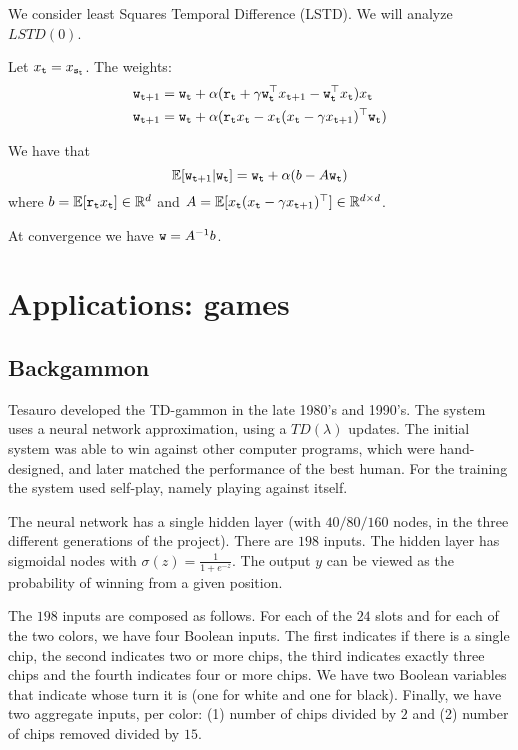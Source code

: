 \begin{leftbar}
We consider least Squares Temporal Difference (LSTD). We will
analyze $LSTD(0)$.

Let $x_{\tt t}=x_{{\tt s}_{\tt t}}$. The weights:
\begin{align*}
{\tt w}_{{\tt t}+1} &= {\tt w}_{\tt t} +\alpha ({\tt r}_{\tt t}+\gamma
{\tt w}_{\tt t}^\top x_{{\tt t}+1}-{\tt w}_{\tt t}^\top
x_{\tt t})x_{\tt t}\\
{\tt w}_{{\tt t}+1} &= {\tt w}_{\tt t} +\alpha ({\tt r}_{\tt t}
x_{\tt t}-x_{\tt t}(x_{\tt t}-\gamma x_{{\tt t}+1})^\top {\tt w}_{\tt t})
\end{align*}

We have that
\[
\mathbb{E}[{\tt w}_{{\tt t}+1}|{\tt w}_{\tt t}]={\tt w}_{\tt t} +\alpha
(b-A{\tt w}_{\tt t})
\]
where $b=\mathbb{E}[{\tt r}_{\tt t} x_{\tt t}]\in \mathbb{R}^d$ and
$A=\mathbb{E}[x_{\tt t}(x_{\tt t}-\gamma x_{{\tt t}+1})^\top]\in\mathbb{R}^{d\times
d}$.

At convergence we have ${\tt w}=A^{-1}b$.

\end{leftbar}


\section{Applications: games}

\subsection{Backgammon}

Tesauro developed the TD-gammon in the late 1980's and 1990's. The
system uses a neural network approximation, using a $TD(\lambda)$
updates. The initial system was able to win against other computer
programs, which were hand-designed, and later matched the
performance of the best human. For the training the system used
self-play, namely playing against itself.

The neural network has a single hidden layer (with $40/80/160$
nodes, in the three different generations of the project). There are
$198$ inputs. The hidden layer has sigmoidal nodes with
$\sigma(z)=\frac{1}{1+e^{-z}}$. The output $y$ can be viewed as the
probability of winning from a given position.

The $198$ inputs are composed as follows. For each of the $24$ slots
and for each of the two colors, we have four Boolean inputs. The
first indicates if there is a single chip, the second indicates two
or more chips, the third indicates exactly three chips and the
fourth indicates four or more chips. We have two Boolean variables
that indicate whose turn it is (one for white and one for black).
Finally, we have two aggregate inputs, per color: (1) number of
chips divided by $2$ and (2) number of chips removed divided by
$15$.

